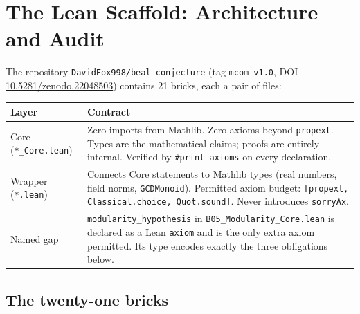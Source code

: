 \documentclass[12pt,reqno]{amsart}
\theoremstyle{plain}
\theoremstyle{definition}
\theoremstyle{remark}
\begin{document}
\section{The Lean Scaffold: Architecture and Audit}
\label{sec:scaffold}

The repository \texttt{DavidFox998/beal-conjecture} (tag \texttt{mcom-v1.0},
DOI \href{https://doi.org/10.5281/zenodo.22048503}{10.5281/zenodo.22048503})
contains 21 bricks, each a pair of files:

\begin{center}
\begin{tabular}{@{}lp{8.8cm}@{}}
\toprule
\textbf{Layer} & \textbf{Contract} \\
\midrule
Core (\texttt{*\_Core.lean})
  & Zero imports from Mathlib. Zero axioms beyond \texttt{propext}.
    Types are the mathematical claims; proofs are entirely internal.
    Verified by \texttt{\#print~axioms} on every declaration. \\[3pt]
Wrapper (\texttt{*.lean})
  & Connects Core statements to Mathlib types (real numbers, field norms,
    \texttt{GCDMonoid}). Permitted axiom budget:
    \texttt{[propext, Classical.choice, Quot.sound]}.
    Never introduces \texttt{sorryAx}. \\[3pt]
Named gap
  & \texttt{modularity\_hypothesis} in \texttt{B05\_Modularity\_Core.lean}
    is declared as a Lean \texttt{axiom} and is the only extra axiom
    permitted. Its type encodes exactly the three obligations below. \\
\bottomrule
\end{tabular}
\end{center}

\subsection{The twenty-one bricks}
\end{document}
